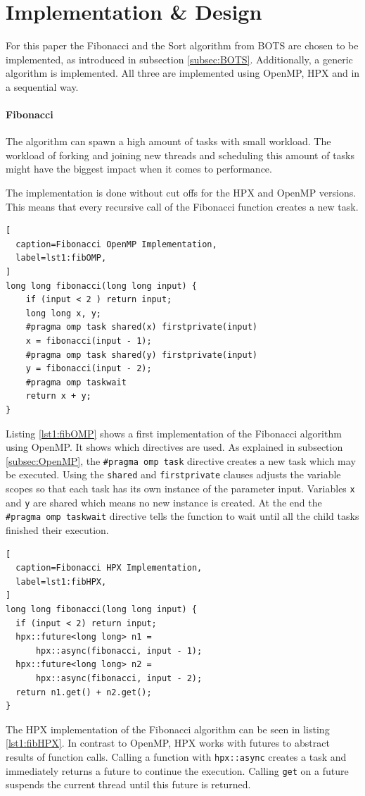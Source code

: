 \section{Implementation \& Design}
\label{sec:implem}
  For this paper the Fibonacci and the Sort algorithm from BOTS are chosen to be implemented, as introduced in subsection \ref{subsec:BOTS}.
  Additionally, a generic algorithm is implemented.
  All three are implemented using OpenMP, HPX and in a sequential way.
  
  \paragraph{Fibonacci}
  The algorithm can spawn a high amount of tasks with small workload.
  The workload of forking and joining new threads and scheduling this amount of tasks might have the biggest impact when it comes to performance.
  
  The implementation is done without cut offs for the HPX and OpenMP versions.
  This means that every recursive call of the Fibonacci function creates a new task.
  \begin{lstlisting}[
  caption=Fibonacci OpenMP Implementation,
  label=lst1:fibOMP,
]
long long fibonacci(long long input) {
    if (input < 2 ) return input;
    long long x, y;
    #pragma omp task shared(x) firstprivate(input)
    x = fibonacci(input - 1);
    #pragma omp task shared(y) firstprivate(input)
    y = fibonacci(input - 2);
    #pragma omp taskwait
    return x + y;
}
\end{lstlisting}
  Listing \ref{lst1:fibOMP} shows a first implementation of the Fibonacci algorithm using OpenMP.
  It shows which directives are used.
  As explained in subsection \ref{subsec:OpenMP}, the \texttt{\#pragma omp task} directive creates a new task which may be executed.
  Using the \texttt{shared} and \texttt{firstprivate} clauses adjusts the variable scopes so that each task has its own instance of the parameter input.
  Variables \texttt{x} and \texttt{y} are shared which means no new instance is created.
  At the end the \texttt{\#pragma omp taskwait} directive tells the function to wait until all the child tasks finished their execution.
  
\begin{lstlisting}[
  caption=Fibonacci HPX Implementation,
  label=lst1:fibHPX,
]
long long fibonacci(long long input) {
  if (input < 2) return input;
  hpx::future<long long> n1 =
      hpx::async(fibonacci, input - 1);
  hpx::future<long long> n2 = 
      hpx::async(fibonacci, input - 2);
  return n1.get() + n2.get();
}
\end{lstlisting}
  The HPX implementation of the Fibonacci algorithm can be seen in listing \ref{lst1:fibHPX}.
  In contrast to OpenMP, HPX works with futures to abstract results of function calls.
  Calling a function with \texttt{hpx::async} creates a task and immediately returns a future to continue the execution.
  Calling \texttt{get} on a future suspends the current thread until this future is returned.
  \\
 
